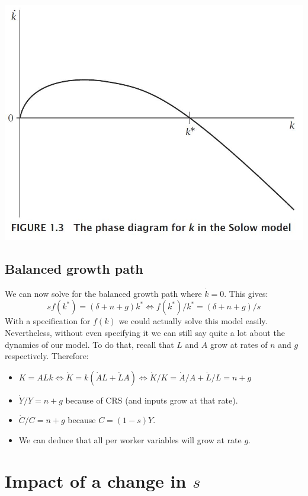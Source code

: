 \documentclass[12pt]{report}
\begin{document}
\begin{center}
\includegraphics[scale=0.35]{images/Solowphase}
\end{center}

\subsection{Balanced growth path}

We can now solve for the balanced growth path where $\dot{k} = 0$. This gives: $$sf(k^*) = (\delta + n + g)k^* \Leftrightarrow f(k^*)/k^* = (\delta + n + g)/s $$ With a specification for $f(k)$ we could actually solve this model easily. Nevertheless, without even specifying it we can still say quite a lot about the dynamics of our model. To do that, recall that $L$ and $A$ grow at rates of $n$ and $g$ respectively. Therefore:\begin{itemize}
\item $K = ALk \Leftrightarrow \dot{K} = k(\dot{A}L + \dot{L}A) \Leftrightarrow \dot{K}/K = \dot{A}/A + \dot{L}/L = n + g $
\item $\dot{Y}/Y = n + g$ because of CRS (and inputs grow at that rate).
\item $\dot{C}/C = n + g$ because $C = (1 -s)Y$.
\item We can deduce that all per worker variables will grow at rate $g$.
\end{itemize}

\section{Impact of a change in $s$}
\end{document}
